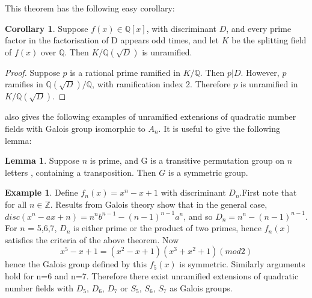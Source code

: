 \documentclass[12pt]{extarticle}
\newcommand{\Q}{\mathbb{Q}}
\newcommand{\<}{\langle}
\renewcommand{\>}{\rangle}
\theoremstyle{definition}
\newtheorem{corollary}{Corollary}
\newtheorem*{example}{Example}
\newtheorem{lemma}{Lemma}
\begin{document}
This theorem has the following easy corollary:
\begin{corollary}
Suppose $f(x) \in \Q[x]$, with discriminant $D$, and every prime factor in the factorisation of D appears odd times, and let $K$ be the splitting field of $f(x)$ over $\Q$. Then $K/\Q\left(\sqrt{D}\right)$ is unramified.
\end{corollary}
\begin{proof}
Suppose $p$ is a rational prime ramified in $K/\Q$. Then $p|D$. However, $p$ ramifies in $\Q(\sqrt{D})/\Q$, with ramification index 2. Therefore $p$ is unramified in $K/\Q(\sqrt{D})$. 
\end{proof}
\cite{uchida1970} also gives the following examples of unramified extensions of quadratic number fields with Galois group isomorphic to $A_n$.
It is useful to give the following lemma:
\begin{lemma}
Suppose $n$ is prime, and G is a transitive permutation group on $n$ letters , containing a transposition. Then $G$ is a symmetric group.
\end{lemma}

\begin{example}
Define $f_n(x) = x^n-x+1$ with discriminant $D_n$.First note that for all $n \in \mathbb{Z}$. Results from Galois theory show that in the general case, $disc(x^n-ax+n) = n^nb^{n-1}-(n-1)^{n-1}a^n$, and so $D_n = n^n-(n-1)^{n-1}$. For $n$ = 5,6,7, $D_n$ is either prime or the product of two primes, hence $f_n(x)$ satisfies the criteria of the above theorem.  Now 
\begin{equation}
x^5 - x+1 = (x^2 - x +1)(x^3 +x^2 +1) (mod 2)
\end{equation}
hence the Galois group defined by this $f_5(x)$ is symmetric. Similarly arguments hold for n=6 and n=7. Therefore there exist unramified extensions of quadratic number fields with $D_5$, $D_6$, $D_7$ or $S_5$, $S_6$, $S_7$ as Galois groups. 
\end{example}
\end{document}
